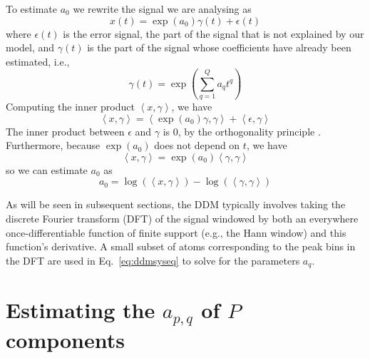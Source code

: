 \documentclass[twoside,a4paper]{article}
\begin{document}
To estimate $a_0$ we rewrite the signal we are analysing as
\begin{equation}
    x(t) = \exp(a_0) \gamma(t) + \epsilon (t)
\end{equation}
where $\epsilon (t)$ is the error signal, the part of the signal that is not explained
by our model, and $\gamma (t)$ is the part of the signal
whose coefficients have already been estimated, i.e.,
\begin{equation}
    \gamma(t) = \exp \left( \sum_{q=1}^{Q} a_{q} t^{q} \right)
\end{equation}
Computing the inner product $\left\langle x , \gamma \right\rangle$, we have
\begin{equation}
    \left\langle x , \gamma \right\rangle
    =
    \left\langle \exp(a_0) \gamma , \gamma \right\rangle + 
        \left\langle \epsilon , \gamma \right\rangle
\end{equation}
The inner product between $\epsilon$ and $\gamma$ is $0$, by the orthogonality
principle \cite[ch.~12]{kay1993fundamentals}. Furthermore, because $\exp(a_0)$ does not
depend on $t$, we have
\begin{equation}
    \left\langle x , \gamma \right\rangle
    =
    \exp(a_0) \left\langle \gamma , \gamma \right\rangle
\end{equation}
so we can estimate $a_0$ as
\begin{equation}
    \label{eq:ddmesta0}
    a_0 = \log \left( \left\langle x , \gamma \right\rangle \right)
        - \log \left( \left\langle \gamma , \gamma \right\rangle \right)
\end{equation}

As will be seen in subsequent sections, the DDM typically involves taking the
discrete Fourier transform (DFT) of the signal windowed by both an everywhere once-differentiable function of
finite support (e.g., the Hann window) and this function's derivative. A small
subset of atoms corresponding to the peak bins in the DFT are used in
Eq.~\ref{eq:ddmsyseq} to solve for the parameters $a_{q}$.

\section{Estimating the \lowercase{$a_{p,q}$} of $P$ components}
\end{document}
